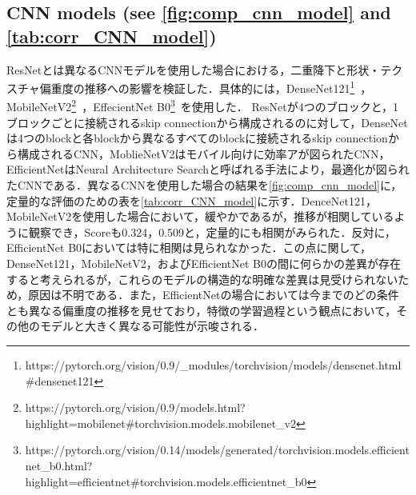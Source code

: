 \subsection[CNN models]{CNN models (see \cref{fig:comp_cnn_model} and \cref{tab:corr_CNN_model})}
ResNetとは異なるCNNモデルを使用した場合における，二重降下と形状・テクスチャ偏重度の推移への影響を検証した．具体的には，DenseNet121\footnote{https://pytorch.org/vision/0.9/\_modules/torchvision/models/densenet.html\#densenet121}~\cite{DenseNet}，MobileNetV2\footnote{https://pytorch.org/vision/0.9/models.html?highlight=mobilenet\#torchvision.models.mobilenet\_v2}~\cite{mobileNetV2}，EffecientNet B0\footnote{https://pytorch.org/vision/0.14/models/generated/torchvision.models.efficientnet\_b0.html?\\highlight=efficientnet\#torchvision.models.efficientnet\_b0}~\cite{EffectiveNet}を使用した． ResNetが4つのブロックと，1ブロックごとに接続されるskip connectionから構成されるのに対して，DenseNetは4つのblockと各blockから異なるすべてのblockに接続されるskip connectionから構成されるCNN，MoblieNetV2はモバイル向けに効率アが図られたCNN，EfficientNetはNeural Architecture Searchと呼ばれる手法により，最適化が図られたCNNである．異なるCNNを使用した場合の結果を\cref{fig:comp_cnn_model}に，定量的な評価のための表を\cref{tab:corr_CNN_model}に示す．DenceNet121，MobileNetV2を使用した場合において，緩やかであるが，推移が相関しているように観察でき，Scoreも0.324，0.509と，定量的にも相関がみられた．反対に，EfficientNet B0においては特に相関は見られなかった．この点に関して，DenseNet121，MobileNetV2，およびEfficientNet B0の間に何らかの差異が存在すると考えられるが，これらのモデルの構造的な明確な差異は見受けられないため，原因は不明である．また，EfficientNetの場合においては今までのどの条件とも異なる偏重度の推移を見せており，特徴の学習過程という観点において，その他のモデルと大きく異なる可能性が示唆される．

